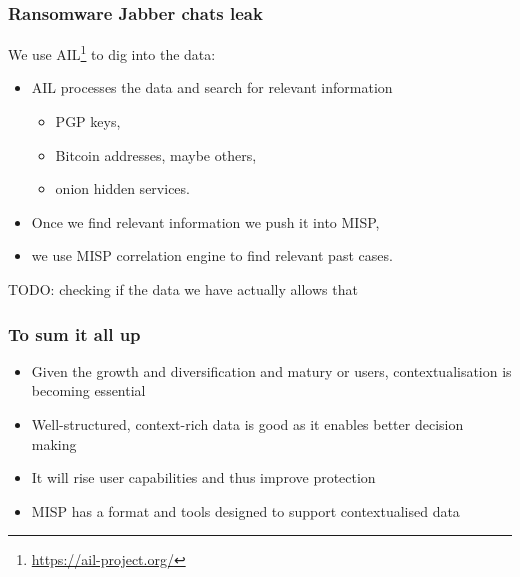 \begin{frame}
    \frametitle{Ransomware Jabber chats leak}
    We use AIL\footnote{\url{https://ail-project.org/}} to dig into the data:
    \begin{itemize}
        \item AIL processes the data and search for relevant information
        \begin{itemize}
        \item PGP keys,
        \item Bitcoin addresses, maybe others,
        \item onion hidden services.
        \end{itemize}
    \item Once we find relevant information we push it into MISP,
    \item we use MISP correlation engine to find relevant past cases.
    \end{itemize}
    TODO: checking if the data we have actually allows that
\end{frame}

\begin{frame}
    \frametitle{To sum it all up}
    \begin{itemize}
        \item Given the growth and diversification and matury or users, contextualisation is becoming essential
        \item Well-structured, context-rich data is good as it enables better decision making
        \item It will rise user capabilities and thus improve protection
        \item MISP has a format and tools designed to support contextualised data
    \end{itemize}
\end{frame}

